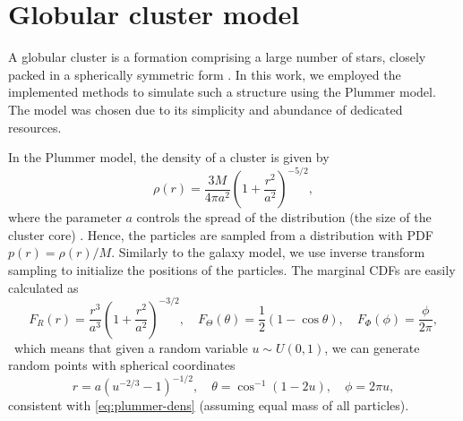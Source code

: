 \section{Globular cluster model}\label{sec:globular-cluster-model}
A globular cluster is a formation comprising a large number of stars, closely packed in a spherically symmetric form \cite{britannica2024globular}.
In this work, we employed the implemented methods to simulate such a structure using the Plummer model.
The model was chosen due to its simplicity and abundance of dedicated resources.

In the Plummer model, the density of a cluster is given by
\begin{equation}\label{eq:plummer-dens}
    \rho(r) = \frac{3M}{4\pi a^2}\left(1 + \frac{r^2}{a^2} \right)^{-5/2},
\end{equation}
where the parameter $a$ controls the spread of the distribution (the size of the cluster core) \cite{Aarseth1974Comparison}.
Hence, the particles are sampled from a distribution with PDF $p(r) = \rho(r) / M$.
Similarly to the galaxy model, we use inverse transform sampling to initialize the positions of the particles.
The marginal CDFs are easily calculated as
\begin{equation*}
    F_R(r) = \frac{r^3}{a^3}\left( 1+\frac{r^2}{a^2} \right)^{-3/2}, \quad
    F_\Theta (\theta) = \frac{1}{2}(1-\cos\theta), \quad
    F_\Phi (\phi) = \frac{\phi}{2\pi},
\end{equation*}\
which means that given a random variable $u\sim U(0, 1)$, we can generate random points with spherical coordinates
\begin{equation}\label{eq:plummer-random-init-pos}
    r = a(u^{-2/3}-1)^{-1/2}, \quad \theta = \cos^{-1}(1-2u), \quad \phi = 2\pi u,
\end{equation}
consistent with \autoref{eq:plummer-dens} (assuming equal mass of all particles).

